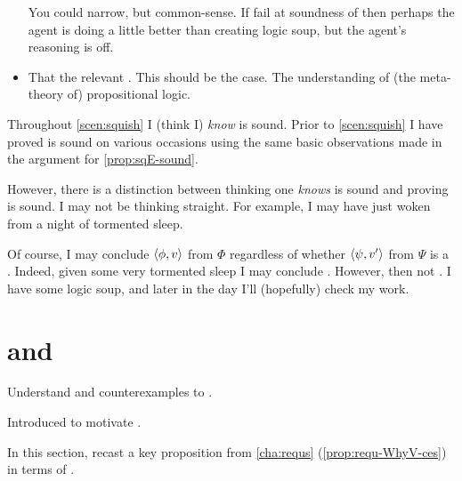 \begin{note}
\begin{itemize}
    You could narrow, but common-sense.
    If fail at soundness of \sqE{} then perhaps the agent is doing a little better than creating logic soup, but the agent's reasoning is off.
  \item
    That the relevant \pool{}.
    This should be the case.
    The \agents{} understanding of (the meta-theory of) propositional logic.
  \end{itemize}

  Throughout \autoref{scen:squish} I (think I) \emph{know} \sqE{} is sound.
  Prior to \autoref{scen:squish} I have proved \sqE{} is sound on various occasions using the same basic observations made in the argument for \autoref{prop:sqE-sound}.

  However, there is a distinction between thinking one \emph{knows} \sqE{} is sound and proving \sqE{} is sound.
  I may not be thinking straight.
  For example, I may have just woken from a night of tormented sleep.

  Of course, I may conclude \(\langle \phi, v \rangle\) from \(\Phi\) regardless of whether \(\langle \psi, v' \rangle\) from \(\Psi\) is a \fc{}.
  Indeed, given some very tormented sleep I may conclude .
  However, then not \tCV{}.
  I have some logic soup, and later in the day I'll (hopefully) check my work.
\end{note}



\section{ and \issueConstraint{}}
\label{sec:tpyically-concluding}

\begin{note}
  Understand \requ{} and counterexamples to \issueConstraint{}.

  Introduced \tCV{} to motivate \requ{}.

  In this section, recast a key proposition from \autoref{cha:requs} (\autoref{prop:requ-WhyV-ces}) in terms of \tCV{}.
\end{note}



